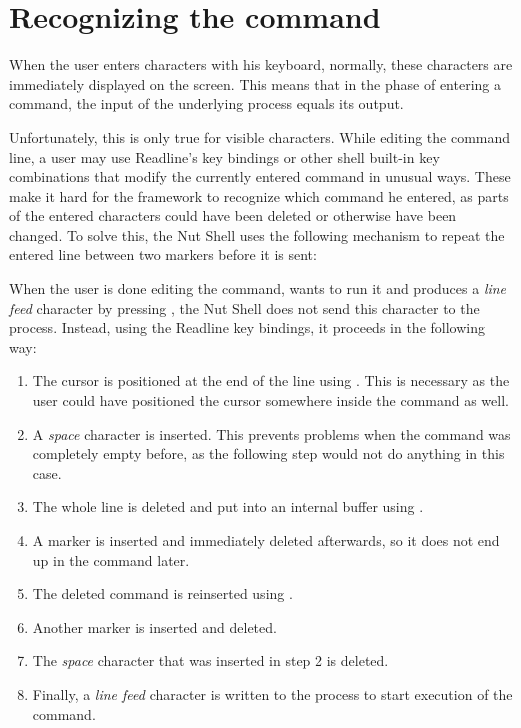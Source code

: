 \documentclass[paper=a4,twoside,abstract=on,cleardoublepage=empty,numbers=noenddot,toc=bib,12pt,appendixprefix=true]{scrreprt}
\begin{document}

\section{Recognizing the command}
\label{sec:reccmd}

When the user enters characters with his keyboard, normally, these characters are immediately displayed on the screen. This means that in the phase of entering a command, the input of the underlying process equals its output.

Unfortunately, this is only true for visible characters. While editing the command line, a user may use Readline's key bindings or other shell built-in key combinations that modify the currently entered command in unusual ways. These make it hard for the framework to recognize which command he entered, as parts of the entered characters could have been deleted or otherwise have been changed. To solve this, the Nut Shell uses the following mechanism to repeat the entered line between two markers before it is sent:

When the user is done editing the command, wants to run it and produces a \emph{line feed} character by pressing , the Nut Shell does not send this character to the process. Instead, using the Readline key bindings, it proceeds in the following way:

\begin{enumerate}
    \item The cursor is positioned at the end of the line using . This is necessary as the user could have positioned the cursor somewhere inside the command as well.
    \item A \emph{space} character is inserted. This prevents problems when the command was completely empty before, as the following step would not do anything in this case.
    \item The whole line is deleted and put into an internal buffer using \mbox{}.
    \item A marker is inserted and immediately deleted afterwards, so it does not end up in the command later.
    \item The deleted command is reinserted using .
    \item Another marker is inserted and deleted.
    \item The \emph{space} character that was inserted in step 2 is deleted.
    \item Finally, a \emph{line feed} character is written to the process to start execution of the command.
\end{enumerate}
\end{document}
